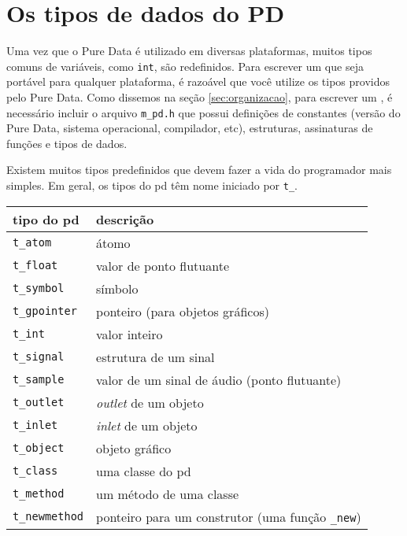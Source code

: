 \chapter{Os tipos de dados do PD}

Uma vez que o Pure Data é utilizado em diversas plataformas, muitos tipos
comuns de variáveis, como \texttt{int}, são redefinidos. Para escrever um
\external que seja portável para qualquer plataforma, é razoável que você
utilize os tipos providos pelo Pure Data. Como dissemos na seção
\ref{sec:organizacao}, para escrever um \external, é necessário incluir o
arquivo \texttt{m\_pd.h} que possui definições de constantes (versão do Pure
Data, sistema operacional, compilador, etc), estruturas, assinaturas de
funções e tipos de dados.

Existem muitos tipos predefinidos que devem fazer a vida do programador mais
simples. Em geral, os tipos do pd têm nome iniciado por \texttt{t\_}.

\begin{center}
\begin{tabular}{|l|l|}
\hline
tipo do pd & descrição \\
\hline
\texttt{t\_atom}      & átomo \\
\texttt{t\_float}     & valor de ponto flutuante \\
\texttt{t\_symbol}    & símbolo \\
\texttt{t\_gpointer}  & ponteiro (para objetos gráficos) \\
\texttt{t\_int}       & valor inteiro \\
\texttt{t\_signal}    & estrutura de um sinal \\
\texttt{t\_sample}    & valor de um sinal de áudio (ponto flutuante) \\
\texttt{t\_outlet}    & \emph{outlet} de um objeto \\
\texttt{t\_inlet}     & \emph{inlet} de um objeto \\
\texttt{t\_object}    & objeto gráfico \\
\texttt{t\_class}     & uma classe do pd \\
\texttt{t\_method}    & um método de uma classe \\
\texttt{t\_newmethod} & ponteiro para um construtor (uma função \texttt{\_new}) \\
\hline
\end{tabular}
\end{center}

